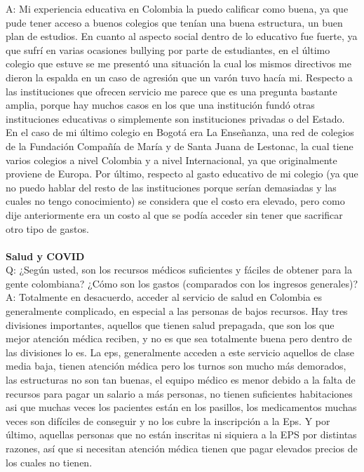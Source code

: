 \documentclass{phyasgn}\usepackage{nag}
\begin{document}
A: Mi experiencia educativa en Colombia la puedo calificar como buena, ya que pude tener acceso a buenos colegios que tenían una buena estructura, un buen plan de estudios. En cuanto al aspecto social dentro de lo educativo fue fuerte, ya que sufrí en varias ocasiones bullying por parte de estudiantes, en el último colegio que estuve se me presentó una situación la cual los mismos directivos me dieron la espalda en un caso de agresión que un varón tuvo hacía mi. Respecto a las instituciones que ofrecen servicio me parece que es una pregunta bastante amplia, porque hay muchos casos en los que una institución fundó otras instituciones educativas o simplemente son instituciones privadas o del Estado. En el caso de mi último colegio en Bogotá era La Enseñanza, una red de colegios de la Fundación Compañía de María y de Santa Juana de Lestonac, la cual tiene varios colegios a nivel Colombia y a nivel Internacional, ya que originalmente proviene de Europa. Por último, respecto al gasto educativo de mi colegio (ya que no puedo hablar del resto de las instituciones porque serían demasiadas y las cuales no tengo conocimiento) se considera que el costo era elevado, pero como dije anteriormente era un costo al que se podía acceder sin tener que sacrificar otro tipo de gastos. \\
\\
\textbf{Salud y COVID}\\
Q: ¿Según usted, son los recursos médicos suficientes y fáciles de obtener para la gente colombiana? ¿Cómo son los gastos (comparados con los ingresos generales)? \\
A: Totalmente en desacuerdo, acceder al servicio de salud en Colombia es generalmente complicado, en especial a las personas de bajos recursos. Hay tres divisiones importantes, aquellos que tienen salud prepagada, que son los que mejor atención médica reciben, y no es que sea totalmente buena pero dentro de las divisiones lo es. La eps, generalmente acceden a este servicio aquellos de clase media baja, tienen atención médica pero los turnos son mucho más demorados, las estructuras no son tan buenas, el equipo médico es menor debido a la falta de recursos para pagar un salario a más personas, no tienen suficientes habitaciones asi que muchas veces los pacientes están en los pasillos, los medicamentos muchas veces son difíciles de conseguir y no los cubre la inscripción a la Eps. Y por último, aquellas personas que no están inscritas ni siquiera a la EPS por distintas razones, así que si necesitan atención médica tienen que pagar elevados precios de los cuales no tienen. \\
\end{document}
